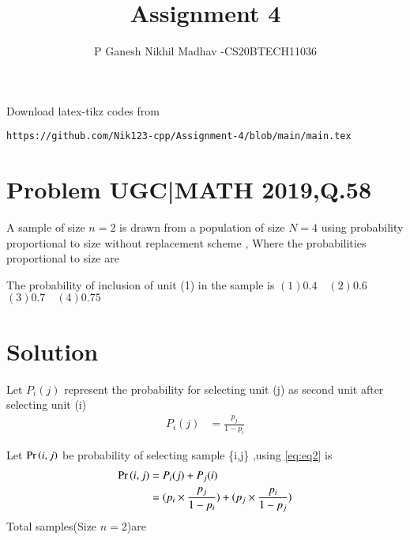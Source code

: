 \documentclass[journal,12pt,twocolumn]{IEEEtran}
\begin{document}
     \def\rightbox#1{\makebox[0in][r]{#1}}
     \def\centbox#1{\makebox[0in]{#1}}
     \def\topbox#1{\raisebox{-\baselineskip}[0in][0in]{#1}}
     \def\midbox#1{\raisebox{-0.5\baselineskip}[0in][0in]{#1}}
\vspace{3cm}
\title{Assignment 4}
\author{P Ganesh Nikhil Madhav -CS20BTECH11036}
\maketitle
\newpage
\bigskip
\renewcommand{\thefigure}{\theenumi}
\renewcommand{\thetable}{\theenumi}
Download latex-tikz codes from 
%
\begin{lstlisting}
https://github.com/Nik123-cpp/Assignment-4/blob/main/main.tex
\end{lstlisting}
\section{ Problem UGC|MATH 2019,Q.58}
A sample of size $n =2$ is drawn from a population of size $N=4$ using probability proportional to size without replacement scheme , Where the probabilities proportional to size are

\begin{table}[h!]
   \caption*{Table : Probability vs Size}
\end{table}  
The probability of inclusion of unit (1) in the sample is 
\newline
$(1) 0.4  \quad (2) 0.6$
\newline
$(3) 0.7  \quad (4) 0.75$
\section{Solution }
Let $P_{i}(j)$ represent the probability for selecting unit (j) as second unit after selecting  unit (i) 
\begin{align}
    P_{i}(j)&=\frac{p_{j}}{1-p_{i}}
    \label{eq:eq2}
\end{align}

Let  $\Pr\left(i,j\right)$ be probability of selecting sample \{i,j\} ,using \eqref{eq:eq2}  is 
\begin{align}
    \Pr\left(i,j\right)&=P_{i}(j)+P_{j}(i)
    \\
    &=(p_{i}\times \frac{p_{j}}{1-p_{i}}) + (p_{j}\times \frac{p_{i}}{1-p_{j}}) 
    \label{eq:eq3}
\end{align}
Total samples(Size $n=2$)are 
\end{document}
